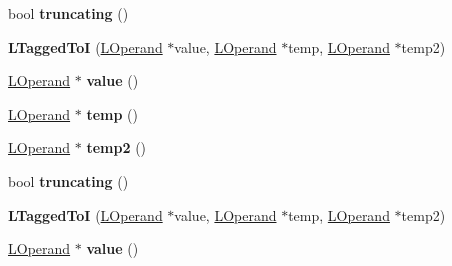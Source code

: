 \begin{DoxyCompactItemize}
\item 
bool {\bfseries truncating} ()\hypertarget{classv8_1_1internal_1_1_l_tagged_to_i_abb946d8222ed5fd6b32d2f5f99cbe24b}{}\label{classv8_1_1internal_1_1_l_tagged_to_i_abb946d8222ed5fd6b32d2f5f99cbe24b}

\item 
{\bfseries L\+Tagged\+ToI} (\hyperlink{classv8_1_1internal_1_1_l_operand}{L\+Operand} $\ast$value, \hyperlink{classv8_1_1internal_1_1_l_operand}{L\+Operand} $\ast$temp, \hyperlink{classv8_1_1internal_1_1_l_operand}{L\+Operand} $\ast$temp2)\hypertarget{classv8_1_1internal_1_1_l_tagged_to_i_afacde0d4471ca6d7246bf7ea8e226f33}{}\label{classv8_1_1internal_1_1_l_tagged_to_i_afacde0d4471ca6d7246bf7ea8e226f33}

\item 
\hyperlink{classv8_1_1internal_1_1_l_operand}{L\+Operand} $\ast$ {\bfseries value} ()\hypertarget{classv8_1_1internal_1_1_l_tagged_to_i_af847eb991b1b476ad690972a7266618d}{}\label{classv8_1_1internal_1_1_l_tagged_to_i_af847eb991b1b476ad690972a7266618d}

\item 
\hyperlink{classv8_1_1internal_1_1_l_operand}{L\+Operand} $\ast$ {\bfseries temp} ()\hypertarget{classv8_1_1internal_1_1_l_tagged_to_i_adc8b5fff519135913c9d0104c2fc6846}{}\label{classv8_1_1internal_1_1_l_tagged_to_i_adc8b5fff519135913c9d0104c2fc6846}

\item 
\hyperlink{classv8_1_1internal_1_1_l_operand}{L\+Operand} $\ast$ {\bfseries temp2} ()\hypertarget{classv8_1_1internal_1_1_l_tagged_to_i_a379b9f67eadcfd31650957f0d0c686a8}{}\label{classv8_1_1internal_1_1_l_tagged_to_i_a379b9f67eadcfd31650957f0d0c686a8}

\item 
bool {\bfseries truncating} ()\hypertarget{classv8_1_1internal_1_1_l_tagged_to_i_abb946d8222ed5fd6b32d2f5f99cbe24b}{}\label{classv8_1_1internal_1_1_l_tagged_to_i_abb946d8222ed5fd6b32d2f5f99cbe24b}

\item 
{\bfseries L\+Tagged\+ToI} (\hyperlink{classv8_1_1internal_1_1_l_operand}{L\+Operand} $\ast$value, \hyperlink{classv8_1_1internal_1_1_l_operand}{L\+Operand} $\ast$temp, \hyperlink{classv8_1_1internal_1_1_l_operand}{L\+Operand} $\ast$temp2)\hypertarget{classv8_1_1internal_1_1_l_tagged_to_i_afacde0d4471ca6d7246bf7ea8e226f33}{}\label{classv8_1_1internal_1_1_l_tagged_to_i_afacde0d4471ca6d7246bf7ea8e226f33}

\item 
\hyperlink{classv8_1_1internal_1_1_l_operand}{L\+Operand} $\ast$ {\bfseries value} ()\hypertarget{classv8_1_1internal_1_1_l_tagged_to_i_af847eb991b1b476ad690972a7266618d}{}\label{classv8_1_1internal_1_1_l_tagged_to_i_af847eb991b1b476ad690972a7266618d}


\end{DoxyCompactItemize}
